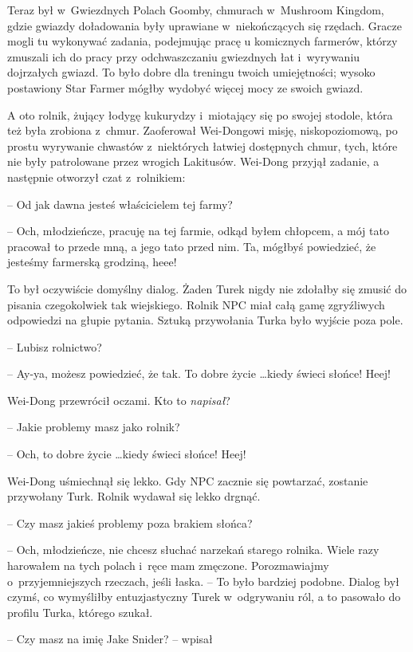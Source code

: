 \documentclass[oneside,polish,11pt,rmheadings]{mwbk}
\begin{document}
Teraz był w~Gwiezdnych Polach Goomby, chmurach w~Mushroom Kingdom, gdzie gwiazdy doładowania były uprawiane w~niekończących się rzędach. Gracze mogli tu wykonywać zadania, podejmując pracę u komicznych farmerów, którzy zmuszali ich do pracy przy odchwaszczaniu gwiezdnych łat i~wyrywaniu dojrzałych gwiazd. To było dobre dla treningu twoich umiejętności; wysoko postawiony Star Farmer mógłby wydobyć więcej mocy ze swoich gwiazd.

A oto rolnik, żujący łodygę kukurydzy i~miotający się po swojej stodole, która też była zrobiona z~chmur. Zaoferował Wei-Dongowi misję, niskopoziomową, po prostu wyrywanie chwastów z~niektórych łatwiej dostępnych chmur, tych, które nie były patrolowane przez wrogich Lakitusów. Wei-Dong przyjął zadanie, a następnie otworzył czat z~rolnikiem: 

-- Od jak dawna jesteś właścicielem tej farmy?

-- Och, młodzieńcze, pracuję na tej farmie, odkąd byłem chłopcem, a mój tato pracował to przede mną, a jego tato przed nim. Ta, mógłbyś powiedzieć, że jesteśmy farmerską grodziną, heee!

To był oczywiście domyślny dialog. Żaden Turek nigdy nie zdołałby się zmusić do pisania czegokolwiek tak wiejskiego. Rolnik NPC miał całą gamę zgryźliwych odpowiedzi na głupie pytania. Sztuką przywołania Turka było wyjście poza pole.

-- Lubisz rolnictwo? 

-- Ay-ya, możesz powiedzieć, że tak. To dobre życie  \ldots kiedy świeci słońce! Heej!

Wei-Dong przewrócił oczami. Kto to \textit{napisał}? 

-- Jakie problemy masz jako rolnik?

-- Och, to dobre życie  \ldots  kiedy świeci słońce! Heej!

Wei-Dong uśmiechnął się lekko. Gdy NPC zacznie się powtarzać, zostanie przywołany Turk. Rolnik wydawał się lekko drgnąć.

-- Czy masz jakieś problemy poza brakiem słońca? 

-- Och, młodzieńcze, nie chcesz słuchać narzekań starego rolnika. Wiele razy harowałem na tych polach i~ręce mam zmęczone. Porozmawiajmy o~przyjemniejszych rzeczach, jeśli łaska. -- To było bardziej podobne. Dialog był czymś, co wymyśliłby entuzjastyczny Turek w~odgrywaniu ról, a to pasowało do profilu Turka, którego szukał.

-- Czy masz na imię Jake Snider? -- wpisał
\end{document}
